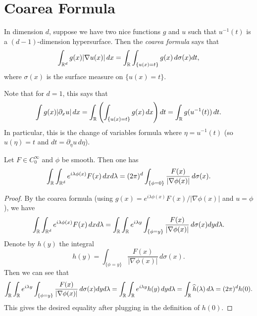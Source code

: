 \section{Coarea Formula}

\begin{remark}
  In dimension $d$, suppose we have two nice functions
  $g$ and $u$ such that $u^{-1}(t)$ is a
  $(d - 1)$-dimension hypersurface. Then the
  \emph{coarea formula} says that
  \[
    \int_{\mathbb{R}^d} g(x) |\nabla u(x)|\, dx
    = \int_{\mathbb{R}} \int_{\{u(x) = t\}} g(x)\, d\sigma(x) dt,
  \]
  where $\sigma(x)$ is the surface measure on
  $\{u(x) = t\}$.

  Note that for $d = 1$, this says that
  \[
    \int g(x) |\partial_x u|\, dx
    = \int_{\mathbb{R}} \left(\int_{\{u(x) = t\}} g(x)\, dx\right) dt
    = \int_{\mathbb{R}} g(u^{-1}(t))\, dt.
  \]
  In particular, this is the change of
  variables formula where $\eta = u^{-1}(t)$ (so
  $u(\eta) = t$ and $dt = \partial_\eta u\, d \eta$).
\end{remark}

\begin{lemma}
  Let $F \in C_0^\infty$ and $\phi$ be smooth. Then
  one has
  \[
    \int_{\mathbb{R}} \int_{\mathbb{R}^d} e^{i \lambda \phi(x)} F(x)\, dx d\lambda
    = (2\pi)^d \int_{\{\phi = 0\}} \frac{F(x)}{|\nabla \phi(x)|}\, d\sigma(x).
  \]
\end{lemma}

\begin{proof}
  By the coarea formula (using $g(x) = e^{i \lambda \phi(x)} F(x) / |\nabla \phi(x)|$ and $u = \phi$), we have
  \[
    \int_{\mathbb{R}} \int_{\mathbb{R}^d} e^{i\lambda \phi(x)} F(x)\, dx d\lambda
    = \int_{\mathbb{R}} \int_{\mathbb{R}} e^{i \lambda y} \int_{\{\phi = y\}} \frac{F(x)}{|\nabla \phi(x)|}\, d\sigma(x) dy d\lambda.
  \]
  Denote by $h(y)$ the integral
  \[
    h(y) = \int_{\{\phi = y\}} \frac{F(x)}{|\nabla \phi(x)|}\, d\sigma(x).
  \]
  Then we can see that
  \[
    \int_{\mathbb{R}} \int_{\mathbb{R}} e^{i \lambda y} \int_{\{\phi = y\}} \frac{F(x)}{|\nabla \phi(x)|}\, d\sigma(x) dy d\lambda
    = \int_{\mathbb{R}} \int_{\mathbb{R}} e^{i \lambda y} h(y)\, dy d\lambda
    = \int_{\mathbb{R}} \widehat{h}(\lambda)\, d\lambda
    = (2\pi)^d h(0).
  \]
  This gives the desired equality after plugging
  in the definition of $h(0)$.
\end{proof}
